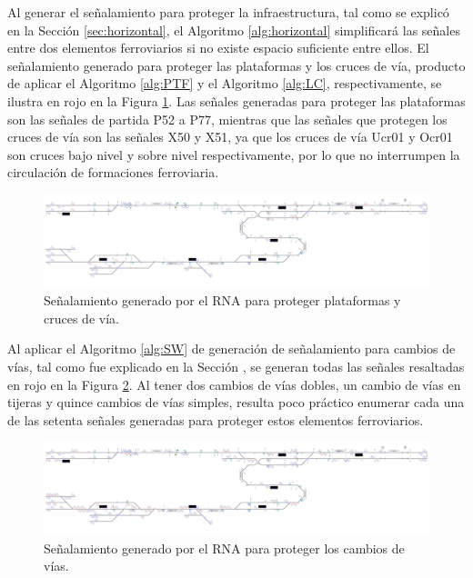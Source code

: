 	Al generar el señalamiento para proteger la infraestructura, tal como se explicó en la Sección \ref{sec:horizontal}, el Algoritmo \ref{alg:horizontal} simplificará las señales entre dos elementos ferroviarios si no existe espacio suficiente entre ellos. El señalamiento generado para proteger las plataformas y los cruces de vía, producto de aplicar el Algoritmo \ref{alg:PTF} y el Algoritmo \ref{alg:LC}, respectivamente, se ilustra en rojo en la Figura \ref{fig:EJ3_5}. Las señales generadas para proteger las plataformas son las señales de partida P52 a P77, mientras que las señales que protegen los cruces de vía son las señales X50 y X51, ya que los cruces de vía Ucr01 y Ocr01 son cruces bajo nivel y sobre nivel respectivamente, por lo que no interrumpen la circulación de formaciones ferroviaria.
	
	\begin{figure}[H]
		\centering
		\includegraphics[width=1\textwidth]{resultados-obtenidos/ejemplo3/images/3_step3.png}
		\centering\caption{Señalamiento generado por el RNA para proteger plataformas y cruces de vía.}
		\label{fig:EJ3_5}
	\end{figure}
	
	Al aplicar el Algoritmo \ref{alg:SW} de generación de señalamiento para cambios de vías, tal como fue explicado en la Sección \label{sec:signal_switches}, se generan todas las señales resaltadas en rojo en la Figura \ref{fig:EJ3_6}. Al tener dos cambios de vías dobles, un cambio de vías en tijeras y quince cambios de vías simples, resulta poco práctico enumerar cada una de las setenta señales generadas para proteger estos elementos ferroviarios. 
	
	\begin{figure}[H]
		\centering
		\includegraphics[width=1\textwidth]{resultados-obtenidos/ejemplo3/images/3_step4.png}
		\centering\caption{Señalamiento generado por el RNA para proteger los cambios de vías.}
		\label{fig:EJ3_6}
	\end{figure}
	

